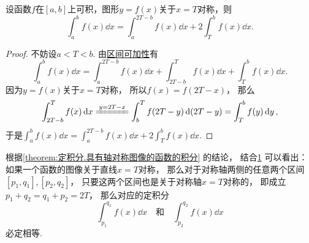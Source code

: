 \begin{proposition}\label{theorem:定积分.具有轴对称图像的函数的积分}
设函数\(f\)在\([a,b]\)上可积，图形\(y=f(x)\)关于\(x=T\)对称，则\begin{equation}
	\int_a^b f(x) \dd{x} = \int_a^{2T-b} f(x) \dd{x} + 2 \int_T^b f(x) \dd{x}.
\end{equation}
\begin{proof}
不妨设\(a < T < b\).
由\hyperref[theorem:定积分.定积分性质3]{区间可加性}有\[
	\int_a^b f(x) \dd{x}
	= \int_a^{2T-b} f(x) \dd{x}
	+ \int_{2T-b}^T f(x) \dd{x}
	+ \int_T^b f(x) \dd{x}.
\]
因为\(y=f(x)\)关于\(x=T\)对称，
所以\(f(x) = f(2T-x)\)，
那么\[
	\int_{2T-b}^T f(x) \dd{x}
	\xlongequal{y=2T-x}
	\int_b^T f(2T-y) \dd(2T-y)
	= \int_T^b f(y) \dd{y},
\]
于是\(\int_a^b f(x) \dd{x} = \int_a^{2T-b} f(x) \dd{x} + 2 \int_T^b f(x) \dd{x}\).
\end{proof}
\end{proposition}
\begin{remark}
根据\cref{theorem:定积分.具有轴对称图像的函数的积分} 的结论，
结合\cref{figure:定积分.具有轴对称图像的函数的积分} 可以看出：
如果一个函数的图像关于直线\(x=T\)对称，
那么对于对称轴两侧的任意两个区间\([p_1,q_1],[p_2,q_2]\)，
只要这两个区间也是关于对称轴\(x=T\)对称的，
即成立\(p_1 + q_2 = q_1 + p_2 = 2T\)，
那么对应的定积分\[
	\int_{p_1}^{q_1} f(x) \dd{x}
	\quad\text{和}\quad
	\int_{p_2}^{q_2} f(x) \dd{x}
\]必定相等.
\end{remark}
\begin{figure}[hbt]
	\centering
	\caption{}
	\label{figure:定积分.具有轴对称图像的函数的积分}
\end{figure}

